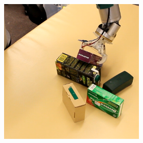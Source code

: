 \begin{figure}
\begin{subfigure}[t]{\textwidth}
\begin{subfigure}[t]{0.195\textwidth}
\end{subfigure}
\begin{subfigure}[t]{0.195\textwidth}
\centering 
\includegraphics[width=\textwidth]{Img/experiments/exp_good/action5c.png}
\end{subfigure}
\\
\begin{subfigure}[t]{0.195\textwidth}
\centering 
{}

\end{subfigure}
\end{subfigure}
\end{figure}
